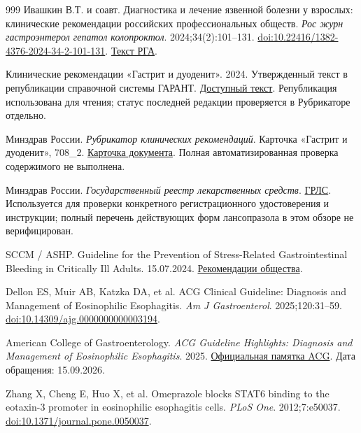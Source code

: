 \documentclass[11pt,a4paper,notitlepage]{report}
\begin{document}
\begin{thebibliography}{999}
 Ивашкин В.Т. и соавт. Диагностика и лечение язвенной болезни у взрослых: клинические рекомендации российских профессиональных обществ. \textit{Рос журн гастроэнтерол гепатол колопроктол}. 2024;34(2):101--131. \href{https://doi.org/10.22416/1382-4376-2024-34-2-101-131}{doi:10.22416/1382-4376-2024-34-2-101-131}. \href{https://www.gastro.ru/userfiles/R_Yaz_2024.pdf}{Текст РГА}.

 Клинические рекомендации «Гастрит и дуоденит». 2024. Утвержденный текст в републикации справочной системы ГАРАНТ. \href{https://base.garant.ru/409334054/}{Доступный текст}. Републикация использована для чтения; статус последней редакции проверяется в Рубрикаторе отдельно.

 Минздрав России. \textit{Рубрикатор клинических рекомендаций}. Карточка «Гастрит и дуоденит», 708\_2. \href{https://cr.minzdrav.gov.ru/view-cr/708_2}{Карточка документа}. Полная автоматизированная проверка содержимого не выполнена.

 Минздрав России. \textit{Государственный реестр лекарственных средств}. \href{https://grls.minzdrav.gov.ru/}{ГРЛС}. Используется для проверки конкретного регистрационного удостоверения и инструкции; полный перечень действующих форм лансопразола в этом обзоре не верифицирован.

 SCCM / ASHP. Guideline for the Prevention of Stress-Related Gastrointestinal Bleeding in Critically Ill Adults. 15.07.2024. \href{https://www.sccm.org/clinical-resources/guidelines/guidelines/sccm-ashp-guideline-prevention-of-ugib}{Рекомендации общества}.

 Dellon ES, Muir AB, Katzka DA, et al. ACG Clinical Guideline: Diagnosis and Management of Eosinophilic Esophagitis. \textit{Am J Gastroenterol}. 2025;120:31--59. \href{https://doi.org/10.14309/ajg.0000000000003194}{doi:10.14309/ajg.0000000000003194}.


 American College of Gastroenterology. \textit{ACG Guideline Highlights: Diagnosis and Management of Eosinophilic Esophagitis}. 2025. \href{https://webfiles.gi.org/links/committees/DigitalCommsAndPubs/ACG-EOE-Guidelines-Highlights-2025.pdf}{Официальная памятка ACG}. Дата обращения: 15.09.2026.

 Zhang X, Cheng E, Huo X, et al. Omeprazole blocks STAT6 binding to the eotaxin-3 promoter in eosinophilic esophagitis cells. \textit{PLoS One}. 2012;7:e50037. \href{https://doi.org/10.1371/journal.pone.0050037}{doi:10.1371/journal.pone.0050037}.


\end{thebibliography}
\end{document}
